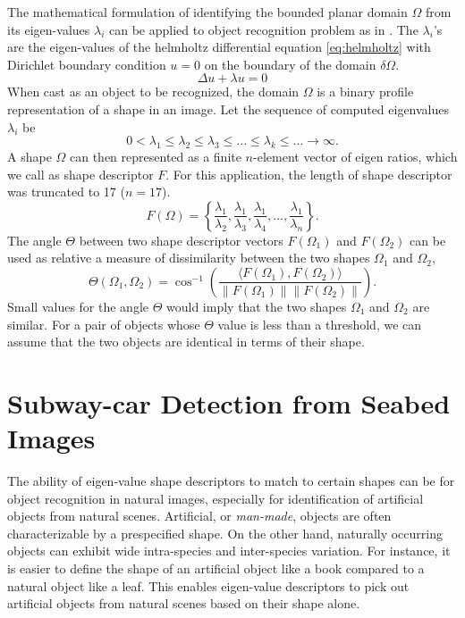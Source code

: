 \documentclass {udthesis}
\begin{document}
The mathematical formulation of identifying the bounded planar domain $\Omega$ from its eigen-values $\lambda_{i}$ can be applied to object recognition problem as in \cite{khabou, zuliani}. The $\lambda_{i}$'s are the eigen-values of the helmholtz differential equation \eqref{eq:helmholtz} with Dirichlet boundary condition $u=0$ on the boundary of the domain $\delta\Omega$.
%
\begin{equation} \label{eq:helmholtz}
\Delta u+\lambda u = 0
\end{equation}
%
When cast as an object to be recognized, the domain $\Omega$ is a binary profile representation of a shape in an image.
Let the sequence of computed eigenvalues $\lambda_i$ be
%
\begin{equation} \label{eq:eigenvalue}
0<\lambda_{1}\leq\lambda_{2}\leq\lambda_{3}\leq\dots\leq\lambda_{k}\leq\dots\rightarrow\infty.
\end{equation}
%
A shape $\Omega$ can then represented as a finite $n$-element vector of eigen ratios, which we call as shape descriptor $F$. For this application, the length of shape descriptor was truncated to 17 ($n=17$).
%
\begin{equation} \label{eq:eigenratio}
F(\Omega) = \left\{\frac{\lambda_{1}}{\lambda_{2}},\frac{\lambda_{1}}{\lambda_{3}},\frac{\lambda_{1}}{\lambda_{4}},\dots,\frac{\lambda_{1}}{\lambda_{n}}\right\}.
\end{equation}
%
The angle $\Theta$ between two shape descriptor vectors $F(\Omega_{1})$ and $F(\Omega_{2})$ can be used as relative a measure of dissimilarity between the two shapes $\Omega_{1}$ and $\Omega_{2}$,
%
\begin{equation} \label{eq:eigendist}
\Theta\left(\Omega_{1},\Omega_{2}\right)=\cos^{-1}\left(\frac{\langle F(\Omega_{1}),F(\Omega_{2})\rangle}{\|F(\Omega_{1})\|\|F(\Omega_{2})\|}\right).
\end{equation}
%
Small values for the angle $\Theta$  would imply that the two shapes $\Omega_{1}$ and $\Omega_{2}$ are similar.
For a pair of objects whose $\Theta$ value is less than a threshold, 
we can assume that the two objects are identical in terms of their shape.


\section{Subway-car Detection from Seabed Images} \label{sec:subwaycar_results}


The ability of eigen-value shape descriptors to match to certain shapes can be for object recognition in natural images, especially for identification of artificial objects from natural scenes. Artificial, or \textit{man-made}, objects are often characterizable by a prespecified shape. On the other hand, naturally occurring objects can exhibit wide intra-species and inter-species variation. For instance, it is easier to define the shape of an artificial object like a book compared to a natural object like a leaf. This enables eigen-value descriptors to pick out artificial objects from natural scenes based on their shape alone.
\end{document}

